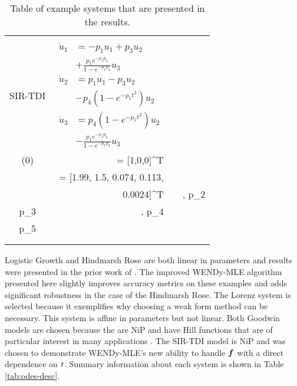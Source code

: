 \begin{table}[H]
{\begin{tabular}{crcc}
	\hline 
	\\[-5pt]
	SIR-TDI & \begin{minipage}{5cm} 
		\begin{equation} \label{eq:sir} 
			\begin{aligned}
				\dot{u}_{1} &= -p_{1}  u_{1} + p_{3}  u_{2} \\
				&+ \tfrac{p_1 e^{-p_1  p_2}}{1 - e^{-p_1  p_2}} u_{3} \\
				\dot{u}_{2} &= p_{1}  u_{1} - p_{3}  u_{2} \\
				& - p_{4}  (1 - e^{-p_{5}  t^2})  u_{2} \\
				\dot{u}_{3} &= p_{4}  (1 - e^{-p_{5}  t^2})  u_{2} \\
				&- \tfrac{p_1 e^{-p_1  p_2}}{1 - e^{-p_1  p_2}}  u_{3}
			\end{aligned}
		\end{equation}
	\end{minipage} & 
	\begin{minipage}{5cm} 
		\(\begin{aligned}
			t &\in [0,50]\\
			\state(0) &= [1,0,0]^T \\
			\trueParams  &= [1.99, 1.5, 0.074, 0.113, \\
			& \hspace{0.25cm} 0.0024]^T 
		\end{aligned} \)
	\end{minipage} & \begin{minipage}{4cm}\( \begin{aligned}
		p_1 &\in [10^{-4},1], \; p_2 \in [10^{-4},2] \\
		p_3 &\in [10^{-4},1], \; p_4 \in [10^{-4},1] \\
		p_5 &\in [10^{-4},1] \\
	\end{aligned}\) \end{minipage}\\\\[-5pt]
	\bottomrule
\end{tabular}
}
\caption{Table of example systems that are presented in the results.}
\label{tab:odes}
\end{table}

Logistic Growth and Hindmarsh Rose are both linear in parameters and results were presented in the prior work of \citep{BortzMessengerDukic2023BullMathBiol}. The improved WENDy-MLE algorithm presented here slightly improves accuracy metrics on these examples and adds significant robustness in the case of the Hindmarsh Rose. The Lorenz system is selected because it exemplifies why choosing a weak form method can be necessary. This system is affine in parameters but not linear. Both Goodwin models are chosen because the are NiP and have Hill functions that are of particular interest in many applications \cite{HIll1910JPhysiol,GoutelleMaurinRougierEtAl2008FundamemntalClinicalPharma}. The SIR-TDI model is NiP and was chosen to demonstrate WENDy-MLE's new ability to handle $\boldsymbol{f}$ with a direct dependence on $t$. Summary information about each system is shown in Table \ref{tab:odes-desc}.



